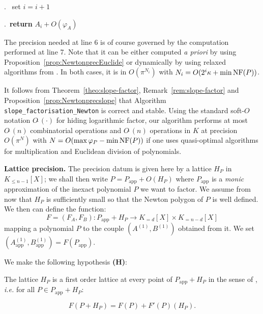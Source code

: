 \documentclass{sig-alternate-05-2015}
\newcommand{\softO}{O\tilde{~}}
\newcommand{\NF}{\text{\rm NF}}
\newcommand{\app}{\textrm{app}}
\begin{document}
\smallskip{}.\ \hspace{5mm}%
set $i = i+1$

\smallskip{}.\ 
{\bf return} $A_i + O(\varphi_A)$

\vspace{-1ex}\noindent\hrulefill

\begin{rem}
The precision needed at line 6 is of course governed by the computation
performed at line 7. Note that it can be either computed \emph{a
priori} by using Proposition~\ref{prop:NewtonprecEuclide} or dynamically 
by using relaxed algorithms from 
\cite{hoeven:02a,hoeven:07a,berthomieu-hoeven-lecerf:11a}. In both 
cases, it is in $O(\pi^{N_i})$ with $N_i = O(2^i \kappa + \min 
\NF(P))$.
\end{rem}

\noindent
It follows from Theorem~\ref{theo:slope-factor}, 
Remark~\ref{rem:slope-factor} and Proposition~\ref{prop:Newtonprecslope} 
that Algorithm {\tt slope\_factorisation\_Newton} is correct and 
stable. Using the standard soft-$O$ notation $\softO(\cdot)$ for
hiding logarithmic factor, our algorithm performs at most $\softO(n)$ 
combinatorial operations and $\softO(n)$ operations in $K$ at precision 
$O(\pi^N)$ with $N = O(\max \varphi_P - \min \NF(P))$ if one uses 
quasi-optimal algorithms for multiplication and Euclidean division of 
polynomials.


\medskip

\noindent
{\bf Lattice precision.}
The precision datum is given here by a lattice $H_P$ in $K_{\leq n{-}1}
[X]$; we shall then write
$P = P_\app + O(H_P)$
where $P_\app$ is a \emph{monic} approximation of the inexact polynomial 
$P$ we want to factor. We assume from now that $H_P$ is sufficiently 
small so that the Newton polygon of $P$ is well defined. We then can
define the function:
$$F = (F_A, F_B) : P_\app + H_P \to K_{=d}[X] \times K_{=n{-}d}[X]$$
mapping a polynomial $P$ to the couple $(A^{(1)}, B^{(1)})$ obtained
from it. We set $(A_\app^{(1)}, B_\app^{(1)}) = F(P_\app)$.

We make the following hypothesis \textbf{(H)}:

\medskip

\noindent
\hfill
\begin{minipage}{8cm}
The lattice $H_P$ is a first order lattice at every point
of $P_\app + H_P$ in the sense of \cite[Definition~3.3]{caruso-roe-vaccon:14a},
\emph{i.e.} for all $P \in P_\app + H_P$:

\vspace{-5mm}

$$F(P + H_P) = F(P) + F'(P)(H_P).$$
\end{minipage}
\hfill \null
\end{document}
